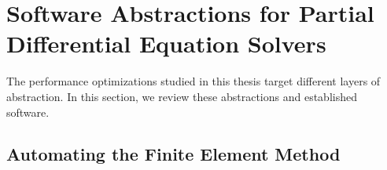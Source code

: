 %




\section{Software Abstractions for Partial Differential Equation Solvers}
\label{sec:bkg:abstractions}

The performance optimizations studied in this thesis target different layers of abstraction. In this section, we review these abstractions and established software.



\subsection{Automating the Finite Element Method}
\label{sec:bkg:fenics-and-firedrake}

